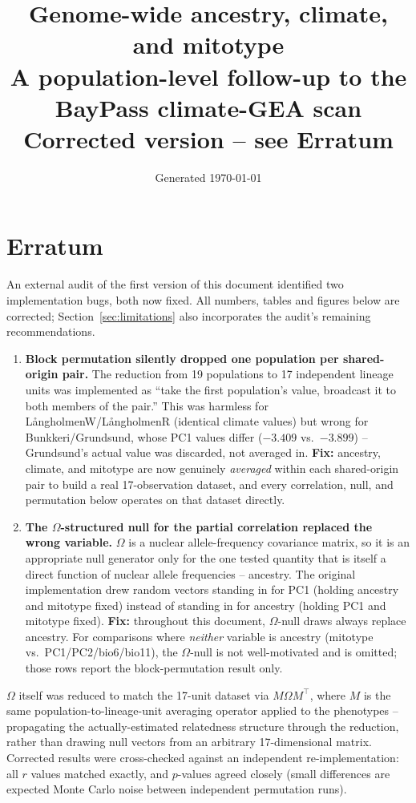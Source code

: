\documentclass[11pt]{article}
\title{\vspace{-3em}\textbf{\color{Accent}Genome-wide ancestry, climate, and mitotype}\\[0.2em]
\large A population-level follow-up to the BayPass climate-GEA scan \\[0.3em]
\normalsize\color{Warn}Corrected version -- see Erratum}
\author{}
\date{\small Generated \today}
\begin{document}
\maketitle
\vspace{-2em}

\section*{\color{Warn}Erratum}
An external audit of the first version of this document identified two implementation
bugs, both now fixed. All numbers, tables and figures below are corrected;
Section~\ref{sec:limitations} also incorporates the audit's remaining recommendations.
\begin{enumerate}
  \item \textbf{Block permutation silently dropped one population per shared-origin
    pair.} The reduction from 19 populations to 17 independent lineage units was
    implemented as ``take the first population's value, broadcast it to both members of
    the pair.'' This was harmless for L{\aa}ngholmenW/L{\aa}ngholmenR (identical climate
    values) but wrong for Bunkkeri/Grundsund, whose PC1 values differ ($-3.409$ vs.\
    $-3.899$) -- Grundsund's actual value was discarded, not averaged in. \textbf{Fix:}
    ancestry, climate, and mitotype are now genuinely \emph{averaged} within each
    shared-origin pair to build a real 17-observation dataset, and every correlation,
    null, and permutation below operates on that dataset directly.
  \item \textbf{The $\Omega$-structured null for the partial correlation replaced the
    wrong variable.} $\Omega$ is a nuclear allele-frequency covariance matrix, so it is
    an appropriate null generator only for the one tested quantity that is itself a
    direct function of nuclear allele frequencies -- ancestry. The original
    implementation drew random vectors standing in for PC1 (holding ancestry and
    mitotype fixed) instead of standing in for ancestry (holding PC1 and mitotype
    fixed). \textbf{Fix:} throughout this document, $\Omega$-null draws always replace
    ancestry. For comparisons where \emph{neither} variable is ancestry (mitotype vs.\
    PC1/PC2/bio6/bio11), the $\Omega$-null is not well-motivated and is omitted; those
    rows report the block-permutation result only.
\end{enumerate}
$\Omega$ itself was reduced to match the 17-unit dataset via $M\Omega M^\top$, where $M$
is the same population-to-lineage-unit averaging operator applied to the phenotypes --
propagating the actually-estimated relatedness structure through the reduction, rather
than drawing null vectors from an arbitrary 17-dimensional matrix. Corrected results were
cross-checked against an independent re-implementation: all $r$ values matched exactly,
and $p$-values agreed closely (small differences are expected Monte Carlo noise between
independent permutation runs).
\end{document}
